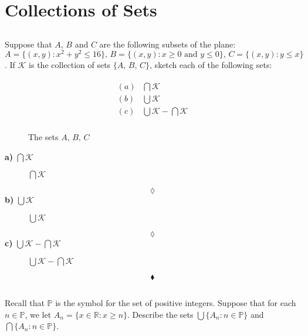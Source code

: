  \section{Collections of Sets}
\subsection{}
\begin{tcolorbox}
Suppose that $A,\, B$ and $C$ are the following subsets of the plane:\\
$A=\{(x,y):x^2+y^2\le 16\},\, B= \{(x,y):x\ge 0 \text{ and } y \le 0\},\, C=\{(x,y): y \le x\}$. If $\mathscr{K}$ is the collection of sets $\{A,\, B,\, C\}$, sketch each of the following sets:

\begin{align*}
\begin{array}{ll}
(a)&\bigcap \mathscr{K}\\
(b)&\bigcup \mathscr{K}\\
(c)&\bigcup \mathscr{K}-\bigcap \mathscr{K}\\
\end{array}
\end{align*}
\end{tcolorbox}
\begin{figure}[H]%
    \centering
    
\caption{The sets $A,\, B , \, C$}
\label{fig:fig_p8b}
\end{figure}
\textbf{a)} $\bigcap \mathscr{K}$
\begin{figure}[H]%
    \centering
   
\caption{$\bigcap \mathscr{K}$}
\label{fig:fig_p8b}
\end{figure}
$$\lozenge$$
\textbf{b)} $\bigcup \mathscr{K}$
\begin{figure}[H]%
    \centering
    
\caption{$\bigcup \mathscr{K}$}
\label{fig:fig_p8b}
\end{figure}
$$\lozenge$$
\textbf{c)} $\bigcup \mathscr{K}-\bigcap \mathscr{K}$
\begin{figure}[H]%
    \centering
   
\caption{$\bigcup \mathscr{K}-\bigcap \mathscr{K}$}
\label{fig:fig_p8b}
\end{figure}
$$\blacklozenge$$
\newpage
\subsection{}
\begin{tcolorbox}
Recall that $\mathbb{P}$ is the symbol for the set of positive integers. Suppose that for each $n\in \mathbb{P}$, we let $A_n=\{x\in \mathbb{R}: x\ge n\}$. Describe the sets $\bigcup\{A_n:n\in\mathbb{P}\}$ and $\bigcap\{A_n:n\in\mathbb{P}\}$.
\end{tcolorbox}

